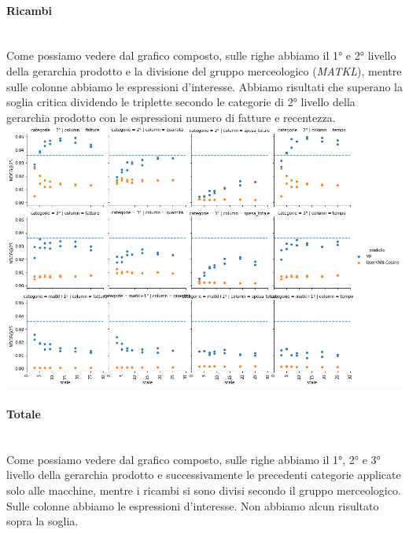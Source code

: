 \paragraph{Ricambi}\mbox{} \\
Come possiamo vedere dal grafico composto, sulle righe abbiamo il 1° e 2° livello della gerarchia prodotto e la divisione del gruppo merceologico (\textit{MATKL}), mentre sulle colonne abbiamo le espressioni d'interesse. Abbiamo risultati che superano la soglia critica dividendo le triplette secondo le categorie di 2° livello della gerarchia prodotto con le espressioni numero di fatture e recentezza.\\

\includegraphics[width=16cm]{figures/risultati_minmax_categoria_ricambi.png}

\paragraph{Totale}\mbox{} \\
Come possiamo vedere dal grafico composto, sulle righe abbiamo il 1°, 2° e 3° livello della gerarchia prodotto e successivamente le precedenti categorie applicate solo alle macchine, mentre i ricambi si sono divisi secondo il gruppo merceologico. Sulle colonne abbiamo le espressioni d'interesse. Non abbiamo alcun risultato sopra la soglia.\\

